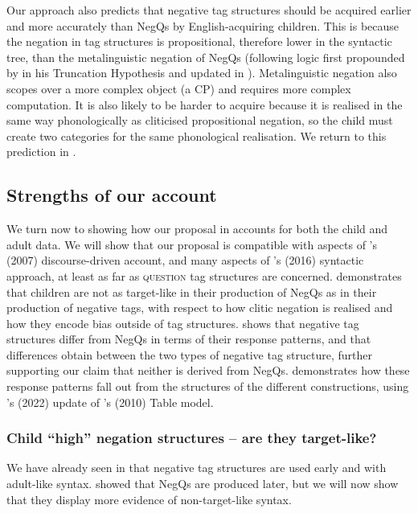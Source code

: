 \documentclass[output=paper,colorlinks,citecolor=brown]{langscibook}
\begin{document}
Our approach also predicts that negative tag structures should be acquired earlier and more accurately than NegQs by English-acquiring children. This is because the negation in tag structures is propositional, therefore lower in the syntactic tree, than the metalinguistic negation of NegQs (following logic first propounded by \citealt{rizzi9394} in his Truncation Hypothesis and updated in \citealt{friedmannetal2021}). Metalinguistic negation also scopes over a more complex object (a CP) and requires more complex computation. It is also likely to be harder to acquire because it is realised in the same way phonologically as cliticised propositional negation, so the child must create two categories for the same phonological realisation. We return to this prediction in .

\subsection{Strengths of our account}\label{sect:strengths}

We turn now to showing how our proposal in  accounts for both the child and adult data. We will show that our proposal is compatible with aspects of \citeauthor{asherreese2007}'s (2007) discourse-driven account, and many aspects of \citeauthor{holmberg2016}'s (2016) syntactic approach, at least as far as \textsc{question} tag structures are concerned.  demonstrates that children are not as target-like in their production of NegQs as in their production of negative tags, with respect to how clitic negation is realised and how they encode bias outside of tag structures.  shows that negative tag structures differ from NegQs in terms of their response patterns, and that differences obtain between the two types of negative tag structure, further supporting our claim that neither is derived from NegQs.  demonstrates how these response patterns fall out from the structures of the different constructions, using \citeauthor{farkas2022}'s (2022) update of \citeauthor{farkasbruce2010}'s (2010) Table model.

\subsubsection{Child ``high'' negation structures -- are they target-like?}\label{sect:strengthstarget}

We have already seen in  that negative tag structures are used early and with adult-like syntax.  showed that NegQs are produced later, but we will now show that they display more evidence of non-target-like syntax. 
\end{document}
